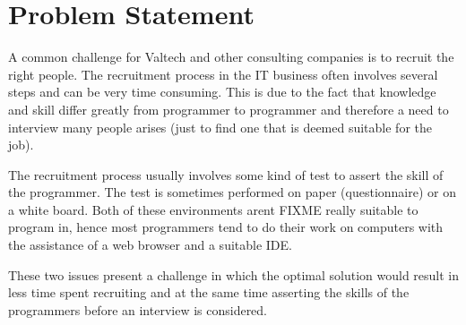 \section{Problem Statement}
A common challenge for Valtech and other consulting companies is to recruit the right people.  The recruitment process in the IT business often involves several steps and can be very time consuming. This is due to the fact that knowledge and skill differ greatly from programmer to programmer and therefore a need to interview many people arises (just to find one that is deemed suitable for the job). 

The recruitment process usually involves some kind of test to assert the skill of the programmer.  The test is sometimes performed on paper (questionnaire) or on a white board. Both of these environments arent FIXME really suitable to program in, hence most programmers tend to do their work on computers with the assistance of a web browser and a suitable IDE. 

These two issues present a challenge in which the optimal solution would result in less time spent recruiting and at the same time asserting the skills of the programmers before an interview is considered.